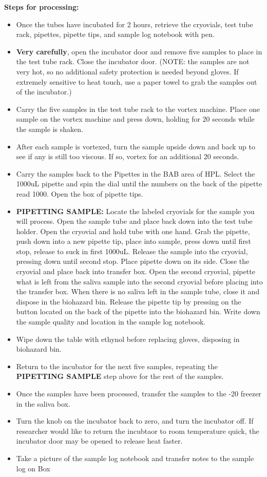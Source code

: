 \documentclass[
]{book}
\providecommand{\tightlist}{%
  \setlength{\itemsep}{0pt}\setlength{\parskip}{0pt}}
\begin{document}
\textbf{Steps for processing:}

\begin{itemize}
\tightlist
\item
  Once the tubes have incubated for 2 hours, retrieve the cryovials, test tube rack, pipettes, pipette tips, and sample log notebook with pen.
\item
  \textbf{Very carefully}, open the incubator door and remove five samples to place in the test tube rack. Close the incubator door. (NOTE: the samples are not very hot, so no additional safety protection is needed beyond gloves. If extremely sensitive to heat touch, use a paper towel to grab the samples out of the incubator.)
\item
  Carry the five samples in the test tube rack to the vortex machine. Place one sample on the vortex machine and press down, holding for 20 seconds while the sample is shaken.
\item
  After each sample is vortexed, turn the sample upside down and back up to see if any is still too viscous. If so, vortex for an additional 20 seconds.
\item
  Carry the samples back to the Pipettes in the BAB area of HPL. Select the 1000uL pipette and spin the dial until the numbers on the back of the pipette read 1000. Open the box of pipette tips.
\item
  \textbf{PIPETTING SAMPLE:} Locate the labeled cryovials for the sample you will process. Open the sample tube and place back down into the test tube holder. Open the cryovial and hold tube with one hand. Grab the pipette, push down into a new pipette tip, place into sample, press down until first stop, release to suck in first 1000uL. Release the sample into the cryovial, pressing down until second stop. Place pipette down on its side. Close the cryovial and place back into transfer box. Open the second cryovial, pipette what is left from the saliva sample into the second cryovial before placing into the transfer box. When there is no saliva left in the sample tube, close it and dispose in the biohazard bin. Release the pipette tip by pressing on the button located on the back of the pipette into the biohazard bin. Write down the sample quality and location in the sample log notebook.
\item
  Wipe down the table with ethynol before replacing gloves, disposing in biohazard bin.
\item
  Return to the incubator for the next five samples, repeating the \textbf{PIPETTING SAMPLE} step above for the rest of the samples.
\item
  Once the samples have been processed, transfer the samples to the -20 freezer in the saliva box.
\item
  Turn the knob on the incubator back to zero, and turn the incubator off. If researcher would like to return the incubtaor to room temperature quick, the incubator door may be opened to release heat faster.
\item
  Take a picture of the sample log notebook and transfer notes to the sample log on Box
\end{itemize}
\end{document}
